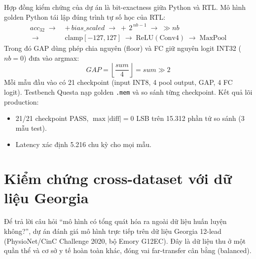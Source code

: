 \documentclass[12pt,a4paper]{article}
\begin{document}
Hợp đồng kiểm chứng của dự án là bit-exactness giữa Python và RTL. Mô hình golden Python tái
lập đúng trình tự số học của RTL:
\begin{equation}
\begin{aligned}
  acc_{32} \;\rightarrow\; &+\,bias\_scaled \;\rightarrow\; +\,2^{\,nb-1} \;\rightarrow\; \gg nb\\
  \;\rightarrow\; &\mathrm{clamp}[-127,127] \;\rightarrow\; \mathrm{ReLU}(\text{Conv4}) \;\rightarrow\; \mathrm{MaxPool}
\end{aligned}
\end{equation}
Trong đó GAP dùng phép chia nguyên (floor) và FC giữ nguyên logit INT32 ($nb=0$) đưa vào
argmax:
\begin{equation}
  GAP = \left\lfloor \frac{sum}{4} \right\rfloor = sum \gg 2
\end{equation}
Mỗi mẫu đầu vào có 21 checkpoint (input INT8, 4 pool output, GAP, 4 FC logit). Testbench
Questa nạp golden \texttt{.mem} và so sánh từng checkpoint. Kết quả lõi production:
\begin{itemize}
  \item 21/21 checkpoint PASS, $\max|\text{diff}| = 0$ LSB trên 15.312 phần tử so sánh
        (3 mẫu test).
  \item Latency xác định 5.216 chu kỳ cho mọi mẫu.
\end{itemize}

\section{Kiểm chứng cross-dataset với dữ liệu Georgia}

Để trả lời câu hỏi ``mô hình có tổng quát hóa ra ngoài dữ liệu huấn luyện không?'', dự án
đánh giá mô hình trực tiếp trên dữ liệu Georgia 12-lead (PhysioNet/CinC Challenge 2020, bộ
Emory G12EC). Đây là dữ liệu thu ở một quần thể và cơ sở y tế hoàn toàn khác, đóng vai
far-transfer cân bằng (balanced).
\end{document}
